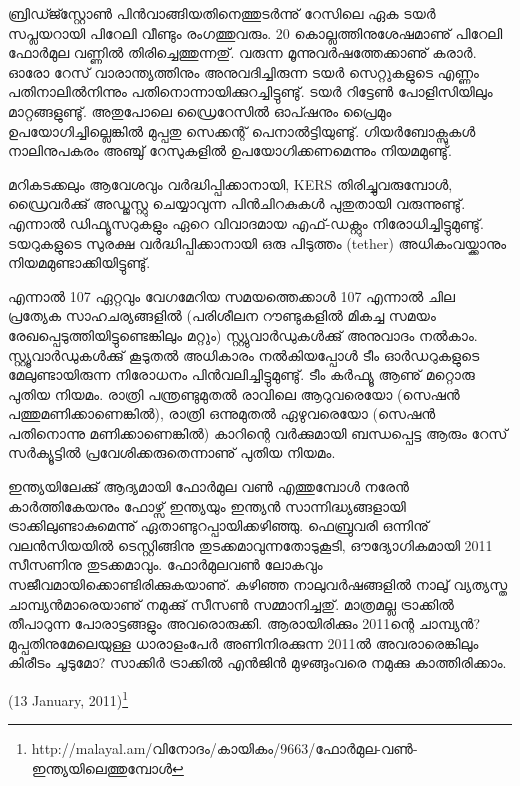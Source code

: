 ബ്രിഡ്ജ്സ്റ്റോണ്‍ പിന്‍വാങ്ങിയതിനെത്തുടര്‍ന്നു് റേസിലെ ഏക ടയര്‍ സപ്ലയറായി പിറേലി വീണ്ടും രംഗത്തുവരും. 20 
കൊല്ലത്തിനുശേഷമാണു് പിറേലി ഫോര്‍മുല വണ്ണില്‍ തിരിച്ചെത്തുന്നതു്. വരുന്ന മൂന്നുവര്‍ഷത്തേക്കാണു് കരാര്‍. ഓരോ
റേസ് വാരാന്ത്യത്തിനും അനുവദിച്ചിരുന്ന ടയര്‍ സെറ്റുകളുടെ എണ്ണം പതിനാലില്‍നിന്നും പതിനൊന്നായിക്കുറച്ചിട്ടുണ്ടു്. 
ടയര്‍ റിട്ടേണ്‍ പോളിസിയിലും മാറ്റങ്ങളുണ്ടു്. അതുപോലെ ഡ്രൈറേസില്‍ ഓപ്ഷനും പ്രൈമും 
ഉപയോഗിച്ചില്ലെങ്കില്‍ മുപ്പതു സെക്കന്റ് പെനാല്‍ട്ടിയുണ്ടു്. ഗിയര്‍ബോക്സുകള്‍ നാലിനുപകരം അഞ്ചു് റേസുകളില്‍ 
ഉപയോഗിക്കണമെന്നും നിയമമുണ്ടു്.

മറികടക്കലും ആവേശവും വര്‍ദ്ധിപ്പിക്കാനായി, KERS തിരിച്ചുവരുമ്പോള്‍, ഡ്രൈവര്‍ക്കു് അഡ്ജസ്റ്റു ചെയ്യാവുന്ന 
പിന്‍ചിറകുകള്‍ പുതുതായി വരുന്നുണ്ടു്. എന്നാല്‍ ഡിഫ്യൂസറുകളും ഏറെ വിവാദമായ എഫ്-ഡക്റ്റും നിരോധിച്ചിട്ടുമുണ്ടു്. 
ടയറുകളുടെ സുരക്ഷ വര്‍ദ്ധിപ്പിക്കാനായി ഒരു പിടുത്തം (tether) അധികംവയ്ക്കാനും നിയമമുണ്ടാക്കിയിട്ടുണ്ടു്.

എന്നാല്‍ 107%
ഏറ്റവും വേഗമേറിയ സമയത്തെക്കാള്‍ 107%
എന്നാല്‍ ചില പ്രത്യേക സാഹചര്യങ്ങളില്‍ (പരിശീലന റൗണ്ടുകളില്‍ മികച്ച സമയം രേഖപ്പെടുത്തിയിട്ടുണ്ടെങ്കിലും മറ്റും) 
സ്റ്റ്യുവാര്‍ഡുകള്‍ക്കു് അനുവാദം നല്‍കാം. സ്റ്റ്യൂവാര്‍ഡുകള്‍ക്കു് കൂടുതല്‍ അധികാരം നല്‍കിയപ്പോള്‍ ടീം ഓര്‍ഡറുകളുടെ 
മേലുണ്ടായിരുന്ന നിരോധനം പിന്‍വലിച്ചിട്ടുമുണ്ടു്. ടീം കര്‍ഫ്യൂ ആണു് മറ്റൊരു പുതിയ നിയമം. രാത്രി പന്ത്രണ്ടുമുതല്‍ 
രാവിലെ ആറുവരെയോ (സെഷന്‍ പത്തുമണിക്കാണെങ്കില്‍), രാത്രി ഒന്നുമുതല്‍ ഏഴുവരെയോ (സെഷന്‍ പതിനൊന്നു 
മണിക്കാണെങ്കില്‍) കാറിന്റെ വര്‍ക്കുമായി ബന്ധപ്പെട്ട ആരും റേസ് സര്‍ക്യൂട്ടില്‍ പ്രവേശിക്കരുതെന്നാണു് പുതിയ നിയമം.

ഇന്ത്യയിലേക്കു് ആദ്യമായി ഫോര്‍മുല വണ്‍ എത്തുമ്പോള്‍ നരേന്‍ കാര്‍ത്തികേയനും ഫോഴ്സ് ഇന്ത്യയും ഇന്ത്യന്‍ 
സാന്നിദ്ധ്യങ്ങളായി ട്രാക്കിലുണ്ടാകുമെന്നു് ഏതാണ്ടുറപ്പായിക്കഴിഞ്ഞു. ഫെബ്രുവരി ഒന്നിനു് വലന്‍സിയയില്‍ ടെസ്റ്റിങ്ങിനു 
തുടക്കമാവുന്നതോടുകൂടി, ഔദ്യോഗികമായി 2011 സീസണിനു തുടക്കമാവും. ഫോര്‍മുലവണ്‍ ലോകവും 
സജീവമായിക്കൊണ്ടിരിക്കുകയാണു്. കഴിഞ്ഞ നാലുവര്‍ഷങ്ങളില്‍ നാലു് വ്യത്യസ്ത ചാമ്പ്യന്‍മാരെയാണു് നമുക്കു് 
സീസണ്‍ സമ്മാനിച്ചതു്. മാത്രമല്ല ട്രാക്കില്‍ തീപാറുന്ന പോരാട്ടങ്ങളും അവരൊരുക്കി. ആരായിരിക്കും 2011ന്റെ ചാമ്പ്യന്‍? 
മുപ്പതിനുമേലെയുള്ള ധാരാളംപേര്‍ അണിനിരക്കുന്ന 2011ല്‍ അവരാരെങ്കിലും കിരീടം ചൂടുമോ? സാക്കിര്‍ ട്രാക്കില്‍ 
എന്‍ജിന്‍ മുഴങ്ങുംവരെ നമുക്കു കാത്തിരിക്കാം.

\hspace*{2em}(13 January, 2011)\footnote{http://malayal.am/വിനോദം/കായികം/9663/ഫോര്‍മുല-വണ്‍-ഇന്ത്യയിലെത്തുമ്പോള്‍}

\newpage
